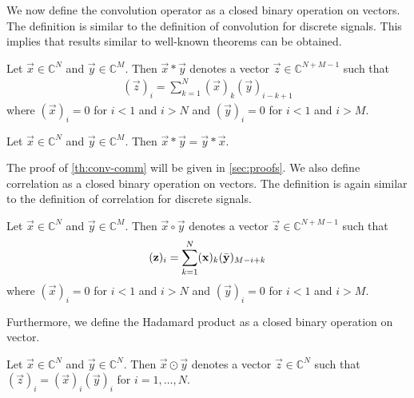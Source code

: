 \documentclass[a4paper, openany, oneside]{memoir}
\begin{document}
We now define the convolution operator as a closed binary operation on vectors. The definition is similar to the definition of convolution for discrete signals. This implies that results similar to well-known theorems can be obtained.

\begin{blockDefinition}[Convolution]
    Let $\vec{x} \in \mathbb{C}^N$ and $\vec{y} \in \mathbb{C}^M$. Then $\vec{x} \ast \vec{y}$ denotes a vector $\vec{z} \in \mathbb{C}^{N+M-1}$ such that
    \begin{align*}
        (\vec{z})_i = \sum_{k=1}^{N} (\vec{x})_k (\vec{y})_{i-k+1}
    \end{align*}
    where $(\vec{x})_i=0$ for $i < 1$ and $i > N$ and $(\vec{y})_i=0$ for $i < 1$ and $i > M$.
\end{blockDefinition}

\begin{blockTheorem} \label{th:conv-comm}
    Let $\vec{x} \in \mathbb{C}^N$ and $\vec{y} \in \mathbb{C}^M$. Then $\vec{x} \ast \vec{y} = \vec{y} \ast \vec{x}$.
\end{blockTheorem}

The proof of \cref{th:conv-comm} will be given in \cref{sec:proofs}. We also define correlation as a closed binary operation on vectors. The definition is again similar to the definition of correlation for discrete signals.

\begin{blockDefinition}
    Let $\vec{x} \in \mathbb{C}^N$ and $\vec{y} \in \mathbb{C}^M$. Then $\vec{x} \circ \vec{y}$ denotes a vector $\vec{z} \in \mathbb{C}^{N+M-1}$ such that
    \begin{align*}
        (\boldsymbol{\mathbf{z}})_i = \sum_{k=1}^{N} (\boldsymbol{\mathbf{x}})_k (\bar{\boldsymbol{\mathbf{y}}})_{M-i+k}
    \end{align*}
    where $(\vec{x})_i=0$ for $i < 1$ and $i > N$ and $(\vec{y})_i=0$ for $i < 1$ and $i > M$.
\end{blockDefinition}

Furthermore, we define the Hadamard product as a closed binary operation on vector.

\begin{blockDefinition}
    Let $\vec{x} \in \mathbb{C}^N$ and $\vec{y} \in \mathbb{C}^N$. Then $\vec{x} \odot \vec{y}$ denotes a vector $\vec{z} \in \mathbb{C}^N$ such that $(\vec{z})_i = (\vec{x})_i (\vec{y})_i$ for $i = 1,\ldots,N$.
\end{blockDefinition}
\end{document}
